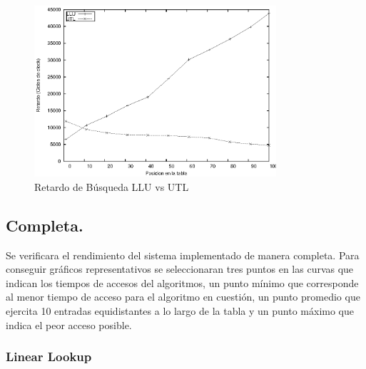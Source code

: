 \begin{figure}[h]
  \centering
	\includegraphics[width=0.8\textwidth]{5-resultados/graf/llu-utlsof.eps}
  \caption{Retardo de Búsqueda LLU vs UTL}
  \label{fig}
\end{figure}

\subsection{Completa.}

Se verificara el rendimiento del sistema implementado de manera completa. Para conseguir gráficos representativos se seleccionaran tres puntos en las curvas que indican los tiempos de accesos del algoritmos, un punto mínimo que corresponde al menor tiempo de acceso para el algoritmo en cuestión, un punto promedio que ejercita 10 entradas equidistantes a lo largo de la tabla y un punto máximo que indica el peor acceso posible. 

\subsubsection{Linear Lookup}


